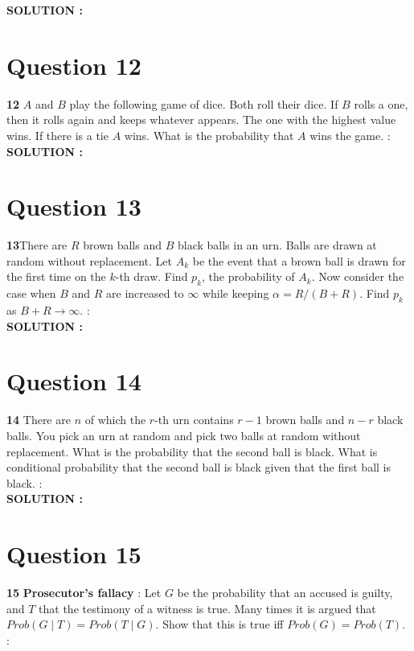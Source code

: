 \documentclass{article}
\begin{document}
\hspace{1em} \large{\textbf{SOLUTION :}} \\

\section{Question 12}
\label{Q12}
\textbf{12} $A$ and $B$ play the following game of dice. Both roll their dice. If $B$ rolls a one, then it rolls again and keeps whatever appears. The one with the highest value wins. If there is a tie $A$ wins. What is the probability that $A$ wins the game. : \\

\hspace{1em} \large{\textbf{SOLUTION :}} \\

\section{Question 13}
\label{Q13}
\textbf{13}There are $R$ brown balls and $B$ black balls in an urn. Balls are drawn at random without replacement. Let $A_k$ be the event that a brown ball is drawn for the first time on the $k$-th draw. Find $p_k$, the probability of $A_k$. Now consider the case when $B$ and $R$ are increased to $\infty$ while keeping $\alpha = R/(B + R).$ Find $p_k$ as $B + R \rightarrow \infty$. : \\

\hspace{1em} \large{\textbf{SOLUTION :}} \\

\section{Question 14}
\label{Q14}
\textbf{14} There are $n$ of which the $r$-th urn contains $r - 1$ brown balls and $n - r$ black balls. You pick an urn at random and pick two balls at random without replacement. What is the probability that the second ball is black. What is conditional probability that the second ball is black given that the first ball is black.  : \\


\hspace{1em} \large{\textbf{SOLUTION :}} \\

\section{Question 15}
\label{Q15}
\textbf{15} \textbf{Prosecutor’s fallacy} : Let $G$ be the probability that an accused is guilty, and $T$ that the testimony of a witness is true. Many times it is argued that $Prob (G \mid T) = Prob (T \mid G)$. Show that this is true iff $Prob (G) = Prob (T).$ : \\ 
\end{document}
